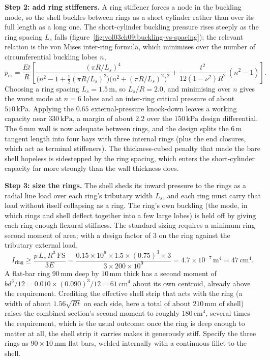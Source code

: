 \textbf{Step 2: add ring stiffeners.} A ring stiffener forces a node in
the buckling mode, so the shell buckles between rings as a short cylinder
rather than over its full length as a long one. The short-cylinder
buckling pressure rises steeply as the ring spacing $L_s$ falls
(figure~\ref{fig:vol03ch09:buckling-vs-spacing}); the relevant relation
is the von Mises inter-ring formula, which minimises over the number of
circumferential buckling lobes $n$,
\[
p_{\text{cr}} = \frac{E t}{R}\left[
\frac{(\pi R/L_s)^4}{\bigl(n^2 - 1 + \tfrac{1}{2}(\pi R/L_s)^2\bigr)
\bigl(n^2 + (\pi R/L_s)^2\bigr)^2}
+ \frac{t^2}{12(1-\nu^2) R^2}\,(n^2 - 1)
\right].
\]
Choosing a ring spacing $L_s = 1.5\,\si{\meter}$, so $L_s/R = 2.0$, and
minimising over $n$ gives the worst mode at $n = 6$ lobes and an
inter-ring critical pressure of about $510\,\text{kPa}$. Applying the
$0.65$ external-pressure knock-down leaves a working capacity near
$330\,\text{kPa}$, a margin of about $2.2$ over the $150\,\text{kPa}$
design differential. The $6\,\si{\milli\meter}$ wall is now adequate
between rings, and the design splits the $6\,\si{\meter}$ tangent length
into four bays with three internal rings (plus the end closures, which
act as terminal stiffeners). The thickness-cubed penalty that made the
bare shell hopeless is sidestepped by the ring spacing, which enters the
short-cylinder capacity far more strongly than the wall thickness does.

\textbf{Step 3: size the rings.} The shell sheds its inward pressure to
the rings as a radial line load over each ring's tributary width
$L_s$, and each ring must carry that load without itself collapsing as a
ring. The ring's own buckling (the  mode,
in which rings and shell deflect together into a few large lobes) is held
off by giving each ring enough flexural stiffness. The standard sizing
requires a minimum ring second moment of area; with a design factor of
$3$ on the ring against the tributary external load,
\[
I_{\text{ring}} \ge \frac{p\,L_s\,R^3\,\text{FS}}{3 E}
= \frac{0.15\times 10^6 \times 1.5\times (0.75)^3\times 3}
{3\times 200\times 10^9}
= 4.7\times 10^{-7}\,\text{m}^4 = 47\,\si{\centi\meter}^4.
\]
A flat-bar ring $90\,\si{\milli\meter}$ deep by $10\,\si{\milli\meter}$
thick has a second moment of $b d^3/12 = 0.010\times (0.090)^3/12 =
61\,\si{\centi\meter}^4$ about its own centroid, already above the
requirement. Crediting the effective shell strip that acts with the ring
(a width of about $1.56\sqrt{R t}$ on each side, here a total of about
$210\,\si{\milli\meter}$ of shell) raises the combined section's second
moment to roughly $180\,\si{\centi\meter}^4$, several times the
requirement, which is the usual outcome: once the ring is deep enough to
matter at all, the shell strip it carries makes it generously stiff.
Specify the three rings as $90\times 10\,\si{\milli\meter}$ flat bars,
welded internally with a continuous fillet to the shell.

